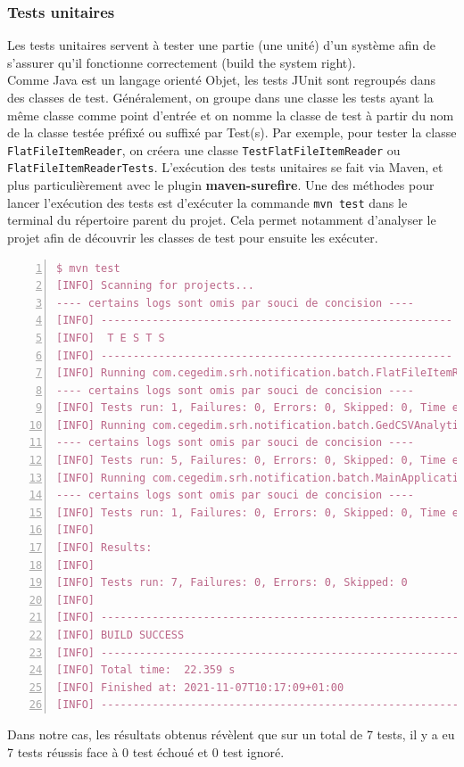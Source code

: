 \subsubsection{Tests unitaires}
Les tests unitaires servent à tester une partie (une unité) d’un système afin de s’assurer qu’il fonctionne correctement (build the system right).\\
Comme Java est un langage orienté Objet, les tests JUnit sont regroupés dans des classes de test. Généralement, on groupe dans une classe les tests ayant la même classe comme point d’entrée et on nomme la classe de test à partir du nom de la classe testée préfixé ou suffixé par Test(s). Par exemple, pour tester la classe \lstinline|FlatFileItemReader|, on créera une classe \lstinline|TestFlatFileItemReader| ou \lstinline|FlatFileItemReaderTests|.
L'exécution des tests unitaires se fait via Maven, et plus particulièrement avec le plugin \textbf{maven-surefire}. Une des méthodes pour lancer l'exécution des tests est d'exécuter la commande \lstinline|mvn test| dans le terminal du répertoire parent du projet. Cela permet notamment d'analyser le projet afin de découvrir les classes de test pour ensuite les exécuter.\\
\begin{lstlisting}[style=DOS,numbers=left,language=tex, deletekeywords={for,source,test}, morekeywords={certains, logs, sont, omis, par, souci, de, concision}]
$ mvn test
[INFO] Scanning for projects...
---- certains logs sont omis par souci de concision ----
[INFO] -------------------------------------------------------
[INFO]  T E S T S
[INFO] -------------------------------------------------------
[INFO] Running com.cegedim.srh.notification.batch.FlatFileItemReaderTests
---- certains logs sont omis par souci de concision ----
[INFO] Tests run: 1, Failures: 0, Errors: 0, Skipped: 0, Time elapsed: 10.926 s - in com.cegedim.srh.notification.batch.FlatFileItemReaderTests
[INFO] Running com.cegedim.srh.notification.batch.GedCSVAnalyticsProcessorTests
---- certains logs sont omis par souci de concision ----
[INFO] Tests run: 5, Failures: 0, Errors: 0, Skipped: 0, Time elapsed: 0.373 s - in com.cegedim.srh.notification.batch.GedCSVAnalyticsProcessorTests
[INFO] Running com.cegedim.srh.notification.batch.MainApplicationTests
---- certains logs sont omis par souci de concision ----
[INFO] Tests run: 1, Failures: 0, Errors: 0, Skipped: 0, Time elapsed: 2.287 s - in com.cegedim.srh.notification.batch.MainApplicationTests
[INFO]
[INFO] Results:
[INFO]
[INFO] Tests run: 7, Failures: 0, Errors: 0, Skipped: 0
[INFO]
[INFO] ------------------------------------------------------------------------
[INFO] BUILD SUCCESS
[INFO] ------------------------------------------------------------------------
[INFO] Total time:  22.359 s
[INFO] Finished at: 2021-11-07T10:17:09+01:00
[INFO] ------------------------------------------------------------------------
\end{lstlisting}
Dans notre cas, les résultats obtenus révèlent que sur un total de 7 tests, il y a eu 7 tests réussis face à 0 test échoué et 0 test ignoré.
